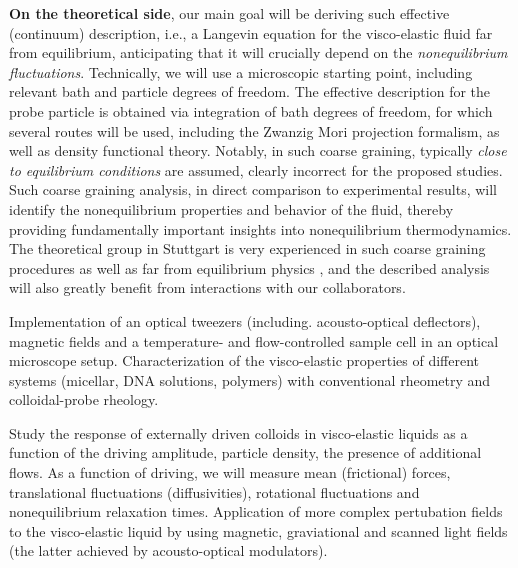 \begin{workpackage}
\begin{wpdescription}
{\bf On the theoretical side}, our main goal will be deriving such effective (continuum)
description, i.e., a Langevin equation for the visco-elastic fluid far from equilibrium,
anticipating that it will crucially depend on the {\it nonequilibrium
  fluctuations}. Technically, we will use a microscopic starting point, including relevant
bath and particle degrees of freedom. The effective description for the probe particle is
obtained via integration of bath degrees of freedom, for which several routes will be used,
including the Zwanzig Mori projection formalism, as well as density functional
theory. Notably, in such coarse graining, typically {\it close to equilibrium conditions}
are assumed, clearly incorrect for the proposed studies. Such coarse graining analysis, in
direct comparison to experimental results, will identify the nonequilibrium properties and
behavior of the fluid, thereby providing fundamentally important insights into
nonequilibrium thermodynamics. The theoretical group in Stuttgart is very experienced in
such coarse graining procedures \cite{Aerov14} as well as far from equilibrium physics \cite{Kruger11,Kruger09}, and the described analysis will also
greatly benefit from interactions with our collaborators.


\end{wpdescription}

\begin{tasklist}

\begin{task}[title=Experimental setup,id=brown-t1,PM=24,lead=USTUTT,wphases=0-24!0.5]
Implementation of an optical tweezers (including. acousto-optical deflectors), magnetic fields and a temperature- and flow-controlled sample cell in an optical microscope setup. Characterization of the visco-elastic properties of different systems (micellar, DNA solutions, polymers) with conventional rheometry and colloidal-probe rheology. 
\end{task}


\begin{task}[title=Externally driven particles in viscoelastic baths,id=brown-t2,PM=24,lead=USTUTT,wphases=0-24!0.5]
Study the response of externally driven colloids in visco-elastic liquids as a function of the driving amplitude, particle density, the presence of additional flows. As a function of driving, we will
measure mean (frictional) forces, translational fluctuations (diffusivities), rotational
fluctuations and nonequilibrium relaxation times. Application of more complex pertubation fields to the visco-elastic liquid by using magnetic, graviational and scanned light fields (the latter achieved by acousto-optical modulators).
\end{task}


\end{tasklist}
\end{workpackage}
